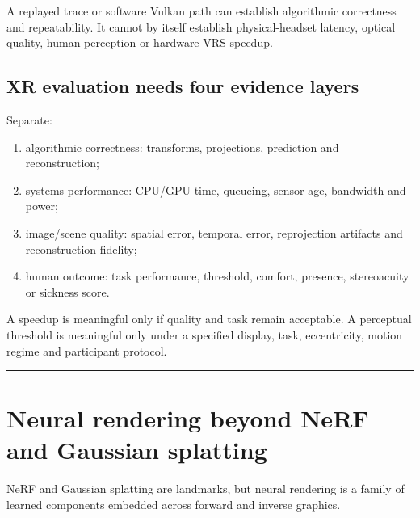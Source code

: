 A replayed trace or software Vulkan path can establish algorithmic correctness and repeatability. It cannot by itself establish physical-headset latency, optical quality, human perception or hardware-VRS speedup.

\subsection{XR evaluation needs four evidence layers}\label{04-visual-computing-ii-ch035-xr-evaluation-needs-four-evidence-layers}

\hypertarget{04-visual-computing-ii-ch035-xr-evaluation-needs-four-evidence-layers}{}

Separate:

\begin{enumerate}
\def\labelenumi{\arabic{enumi}.}
\tightlist
\item
  algorithmic correctness: transforms, projections, prediction and reconstruction;
\item
  systems performance: CPU/GPU time, queueing, sensor age, bandwidth and power;
\item
  image/scene quality: spatial error, temporal error, reprojection artifacts and reconstruction fidelity;
\item
  human outcome: task performance, threshold, comfort, presence, stereoacuity or sickness score.
\end{enumerate}

A speedup is meaningful only if quality and task remain acceptable. A perceptual threshold is meaningful only under a specified display, task, eccentricity, motion regime and participant protocol.

\begin{center}\rule{0.5\linewidth}{0.5pt}\end{center}

\section{Neural rendering beyond NeRF and Gaussian splatting}\label{04-visual-computing-ii-ch035-neural-rendering-beyond-nerf-and-gaussian-splatting}

\hypertarget{04-visual-computing-ii-ch035-neural-rendering-beyond-nerf-and-gaussian-splatting}{}

NeRF and Gaussian splatting are landmarks, but neural rendering is a family of learned components embedded across forward and inverse graphics.

